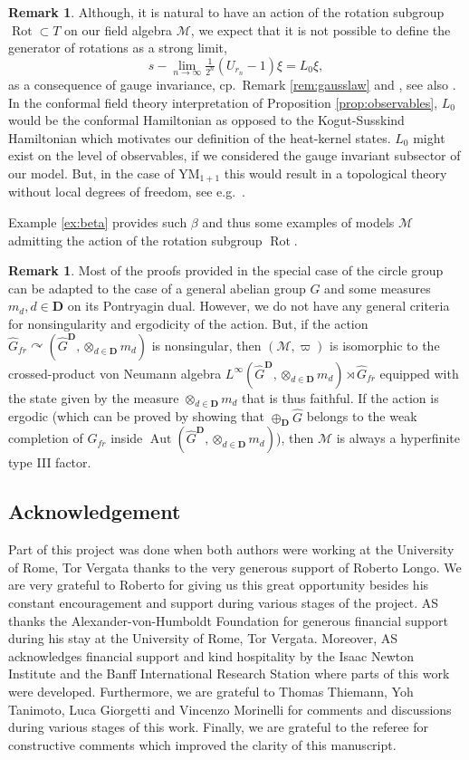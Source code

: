 \documentclass[a4paper,12pt]{amsart}
\numberwithin{equation}{section}
\theoremstyle{definition}
\newtheorem{remark}[theo]{Remark}
\newcommand{\act}{\curvearrowright}
\DeclareMathOperator{\Aut}{Aut}
\newcommand{\D}{\mathbf D}
\newcommand{\scrM}{\mathscr M}
\newcommand{\ot}{\otimes}\newcommand{\otmin}{\otimes_{\text{min}}}
\DeclareMathOperator{\Rot}{Rot}
\newcommand{\wh}{\widehat}
\begin{document}
\begin{remark}
\label{rem:tgauge}
Although, it is natural to have an action of the rotation subgroup $\Rot\subset T$ on our field algebra $\scrM$, we expect that it is not possible to define the generator of rotations as a strong limit,
$$s-\lim_{n\rightarrow\infty}\tfrac{1}{2^{n}}(U_{r_{n}}-1)\xi = L_{0}\xi,$$ 
as a consequence of gauge invariance, cp.~Remark \ref{rem:gausslaw} and \cite{Loeffelholz-03-Temporal-Gauge}, see also \cite{Jones16-Thompson, Brot-Jones18-2}. In the conformal field theory interpretation of Proposition \ref{prop:observables}, $L_{0}$ would be the conformal Hamiltonian as opposed to the Kogut-Susskind Hamiltonian which motivates our definition of the heat-kernel states. $L_{0}$ might exist on the level of observables, if we considered the gauge invariant subsector of our model. But, in the case of YM$_{1+1}$ this would result in a topological theory without local degrees of freedom, see e.g.~\cite{Dimock-96-Yang-Mills}.
\end{remark}

Example \ref{ex:beta} provides such $\beta$ and thus some examples of models $\scrM$ admitting the action of the rotation subgroup $\Rot.$

\begin{remark}\label{rem:generalM}
Most of the proofs provided in the special case of the circle group can be adapted to the case of a general abelian group $G$ and some measures $m_d, d\in\D$ on its Pontryagin dual.
However, we do not have any general criteria for nonsingularity and ergodicity of the action.
But, if the action $\wh G_{fr}\act ({\wh G}^\D, \ot_{d\in\D} m_d)$ is nonsingular, then $(\scrM,\varpi)$ is isomorphic to the crossed-product von Neumann algebra $L^\infty({\wh G}^\D, \ot_{d\in\D} m_d)\rtimes \wh G_{fr}$ equipped with the state given by the measure $\ot_{d\in\D} m_d$ that is thus faithful.
If the action is ergodic (which can be proved by showing that $\oplus_\D\wh G$ belongs to the weak completion of $\wh G_{fr}$ inside $\Aut({\wh G}^\D, \ot_{d\in\D} m_d)$), then $\scrM$ is always a hyperfinite type III factor.
\end{remark}

\subsection*{Acknowledgement}
Part of this project was done when both authors were working at the University of Rome, Tor Vergata thanks to the very generous support of Roberto Longo.
We are very grateful to Roberto for giving us this great opportunity besides his constant encouragement and support during various stages of the project. AS thanks the Alexander-von-Humboldt Foundation for generous financial support during his stay at the University of Rome, Tor Vergata. Moreover, AS acknowledges financial support and kind hospitality by the Isaac Newton Institute and the Banff International Research Station where parts of this work were developed.
Furthermore, we are grateful to Thomas Thiemann, Yoh Tanimoto, Luca Giorgetti and Vincenzo Morinelli for comments and discussions during various stages of this work.
{Finally, we are grateful to the referee for constructive comments which improved the clarity of this manuscript.}
\end{document}
